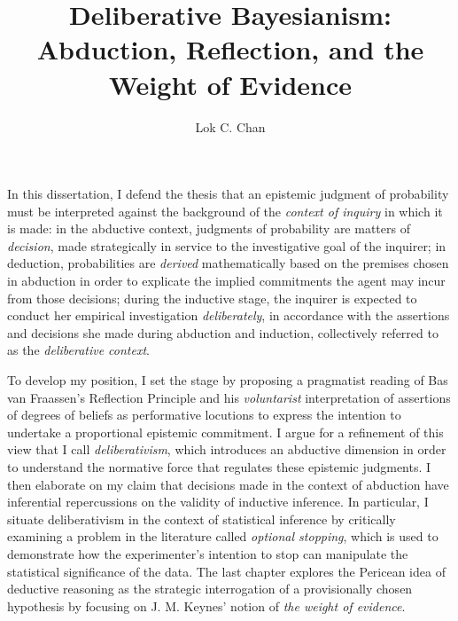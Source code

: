 \documentclass[PhD]{dukethesis2006}
\author{Lok C. Chan}
\title{Deliberative Bayesianism:\\Abduction, Reflection, and the Weight of Evidence}
\begin{document}
\maketitle
\makeabstract
\abstract
In this dissertation, I defend the thesis that an epistemic judgment of
probability must be interpreted against the background of the
\emph{context of inquiry} in which it is made: in the abductive context,
judgments of probability are matters of \emph{decision}, made
strategically in service to the investigative goal of the inquirer; in
deduction, probabilities are \emph{derived} mathematically based on the
premises chosen in abduction in order to explicate the implied
commitments the agent may incur from those decisions; during the
inductive stage, the inquirer is expected to conduct her empirical
investigation \emph{deliberately}, in accordance with the assertions and
decisions she made during abduction and induction, collectively referred
to as the \emph{deliberative context}.

To develop my position, I set the stage by proposing a pragmatist reading of Bas van Fraassen's Reflection Principle and his \emph{voluntarist} interpretation of assertions of degrees of beliefs as performative locutions to express the intention to undertake a proportional epistemic commitment. I argue for a refinement of this view that I call \emph{deliberativism}, which introduces an abductive dimension in order to understand the normative force that regulates these epistemic judgments. I then elaborate on my claim that decisions made in the context of abduction have inferential repercussions on the validity of inductive inference. In particular, I situate deliberativism in the context of statistical inference by critically examining a problem in the literature called \emph{optional stopping}, which is used to demonstrate how the experimenter's intention to stop can manipulate the statistical significance of the data. The last chapter explores the Pericean idea of deductive reasoning as the strategic interrogation of a provisionally chosen hypothesis by focusing on J. M. Keynes' notion of \emph{the weight of evidence}.


\singlespacing
\tableofcontents
\listoffigures
\listoftables
\doublespacing





\printbibliography[heading=bibintoc]
\end{document}
